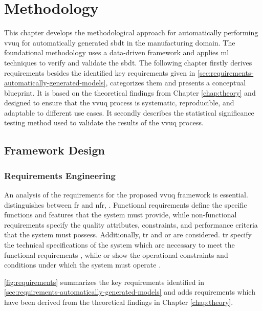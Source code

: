\chapter{Methodology}
\label{chap:methodology}
This chapter develops the methodological approach for automatically performing \gls{vvuq} for automatically generated \gls{sbdt} in the manufacturing domain. The foundational methodology uses a data-driven framework and applies \gls{ml} techniques to verify and validate the \gls{sbdt}. The following chapter firstly derives requirements besides the identified key requirements given in \autoref{sec:requirements-automatically-generated-models}, categorizes them and presents a conceptual blueprint. It is based on the theoretical findings from Chapter \ref{chap:theory} and designed to ensure that the \gls{vvuq} process is systematic, reproducible, and adaptable to different use cases. It secondly describes the statistical significance testing method used to validate the results of the \gls{vvuq} process.

\section{Framework Design}
\subsection{Requirements Engineering}
An analysis of the requirements for the proposed \gls{vvuq} framework is essential. \Textcite{sindhgatta2005functional} distinguishes between \gls{fr} \textcite{van2001goal} and \gls{nfr}, \textcite{glinz2005rethinking}. Functional requirements define the specific functions and features that the system must provide, while non-functional requirements specify the quality attributes, constraints, and performance criteria that the system must possess. Additionally, \gls{tr} and \gls{or} are considered. \gls{tr} specify the technical specifications of the system which are necessary to meet the functional requirements \autocite{chikh2012new}, while \gls{or} show the operational constraints and conditions under which the system must operate \autocite{incose2023incose}.

\autoref{fig:requirements} summarizes the key requirements identified in \autoref{sec:requirements-automatically-generated-models} and adds requirements which have been derived from the theoretical findings in Chapter \ref{chap:theory}.

